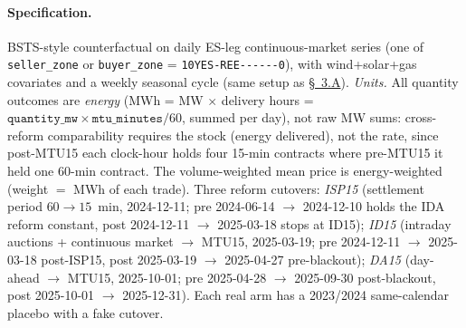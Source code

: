 \documentclass[11pt]{article}
\begin{document}
\paragraph{Specification.} BSTS-style counterfactual on daily ES-leg continuous-market series (one of \texttt{seller\_zone} or \texttt{buyer\_zone} = \texttt{10YES-REE-{}-{}-{}-{}-{}-0}), with wind+solar+gas covariates and a weekly seasonal cycle (same setup as \hyperref[sec:bsts]{\S~3.A}). \emph{Units.} All quantity outcomes are \emph{energy} (MWh = MW $\times$ delivery hours = $\texttt{quantity\_mw} \times \texttt{mtu\_minutes}/60$, summed per day), not raw MW sums: cross-reform comparability requires the stock (energy delivered), not the rate, since post-MTU15 each clock-hour holds four 15-min contracts where pre-MTU15 it held one 60-min contract. The volume-weighted mean price is energy-weighted (weight $=$ MWh of each trade). Three reform cutovers: \emph{ISP15} (settlement period $60\to15$~min, 2024-12-11; pre 2024-06-14 $\to$ 2024-12-10 holds the IDA reform constant, post 2024-12-11 $\to$ 2025-03-18 stops at ID15); \emph{ID15} (intraday auctions + continuous market $\to$ MTU15, 2025-03-19; pre 2024-12-11 $\to$ 2025-03-18 post-ISP15, post 2025-03-19 $\to$ 2025-04-27 pre-blackout); \emph{DA15} (day-ahead $\to$ MTU15, 2025-10-01; pre 2025-04-28 $\to$ 2025-09-30 post-blackout, post 2025-10-01 $\to$ 2025-12-31). Each real arm has a 2023/2024 same-calendar placebo with a fake cutover.
\end{document}
